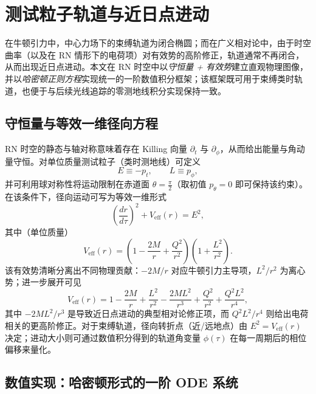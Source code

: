 \documentclass[a4paper,12pt]{article}
\begin{document}
\section{测试粒子轨道与近日点进动}

在牛顿引力中，中心力场下的束缚轨道为闭合椭圆；而在广义相对论中，由于时空曲率（以及在 RN 情形下的电荷项）对有效势的高阶修正，轨道通常不再闭合，从而出现近日点进动。本文在 RN 时空中以\emph{守恒量 + 有效势}建立直观物理图像，并以\emph{哈密顿正则方程}实现统一的一阶数值积分框架；该框架既可用于束缚类时轨道，也便于与后续光线追踪的零测地线积分实现保持一致。

\subsection{守恒量与等效一维径向方程}

RN 时空的静态与轴对称意味着存在 Killing 向量 $\partial_t$ 与 $\partial_\phi$，从而给出能量与角动量守恒。对单位质量测试粒子（类时测地线）可定义
\begin{equation}
E \equiv -p_t, \qquad L \equiv p_\phi,
\end{equation}
并可利用球对称性将运动限制在赤道面 $\theta=\frac{\pi}{2}$（取初值 $p_\theta=0$ 即可保持该约束）。在该条件下，径向运动可写为等效一维形式
\begin{equation}
\left(\frac{dr}{d\tau}\right)^2 + V_{\mathrm{eff}}(r) = E^2,
\label{eq:radial_veff}
\end{equation}
其中（单位质量）
\begin{equation}
V_{\mathrm{eff}}(r)=\left(1-\frac{2M}{r}+\frac{Q^2}{r^2}\right)\left(1+\frac{L^2}{r^2}\right).
\label{eq:veff_rn}
\end{equation}
该有效势清晰分离出不同物理贡献：$-2M/r$ 对应牛顿引力主导项，$L^2/r^2$ 为离心势；进一步展开可见
\begin{equation}
V_{\mathrm{eff}}(r)
=1-\frac{2M}{r}+\frac{L^2}{r^2}-\frac{2ML^2}{r^3}+\frac{Q^2}{r^2}+\frac{Q^2L^2}{r^4},
\end{equation}
其中 $-2ML^2/r^3$ 是导致近日点进动的典型相对论修正项，而 $Q^2L^2/r^4$ 则给出电荷相关的更高阶修正。对于束缚轨道，径向转折点（近/远地点）由 $E^2=V_{\mathrm{eff}}(r)$ 决定；进动大小则可通过数值积分得到的轨道角变量 $\phi(\tau)$ 在每一周期后的相位偏移来量化。

\subsection{数值实现：哈密顿形式的一阶 ODE 系统}
\end{document}
